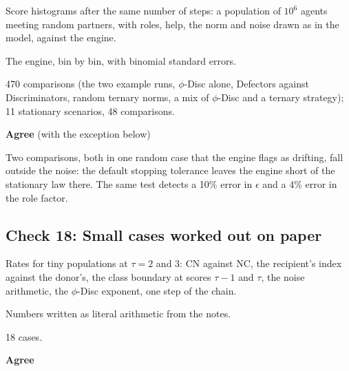 \begin{description}\setlength\itemsep{0pt}

\item[What was checked] Score histograms after the same number of steps: a population of $10^6$ agents meeting random partners, with roles, help, the norm and noise drawn as in the model, against the engine.

\item[Checked against] The engine, bin by bin, with binomial standard errors.

\item[How many] 470 comparisons (the two example runs, $\phi$-Disc alone, Defectors against Discriminators, random ternary norms, a mix of $\phi$-Disc and a ternary strategy); 11 stationary scenarios, 48 comparisons.

\item[Result] \textbf{Agree} (with the exception below)

\item[Note] Two comparisons, both in one random case that the engine flags as drifting, fall outside the noise: the default stopping tolerance leaves the engine short of the stationary law there. The same test detects a 10\% error in $\epsilon$ and a 4\% error in the role factor.

\end{description}


\subsection*{Check 18: Small cases worked out on paper}

\begin{description}\setlength\itemsep{0pt}

\item[What was checked] Rates for tiny populations at $\tau=2$ and $3$: CN against NC, the recipient's index against the donor's, the class boundary at scores $\tau-1$ and $\tau$, the noise arithmetic, the $\phi$-Disc exponent, one step of the chain.

\item[Checked against] Numbers written as literal arithmetic from the notes.

\item[How many] 18 cases.

\item[Result] \textbf{Agree}

\end{description}



